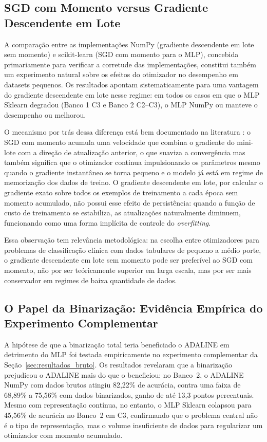 \subsection{SGD com Momento versus Gradiente Descendente em Lote}
\label{sec:discussao_adam}

A compara\c c\~ao entre as implementa\c c\~oes NumPy (gradiente descendente em lote sem momento) e scikit-learn (SGD com momento para o MLP), concebida primariamente para verificar a corretude das implementa\c c\~oes, constitui tamb\'em um experimento natural sobre os efeitos do otimizador no desempenho em datasets pequenos. Os resultados apontam sistematicamente para uma vantagem do gradiente descendente em lote nesse regime: em todos os casos em que o MLP Sklearn degradou (Banco 1 C3 e Banco 2 C2--C3), o MLP NumPy ou manteve o desempenho ou melhorou.

{\sloppy O mecanismo por tr\'as dessa diferen\c ca est\'a bem documentado na literatura \cite{silva2016,dsa2022}: o SGD com momento acumula uma velocidade que combina o gradiente do mini-lote com a dire\c c\~ao de atualiza\c c\~ao anterior, o que suaviza a converg\^encia mas tamb\'em significa que o otimizador continua impulsionando os par\^ametros mesmo quando o gradiente instant\^aneo se torna pequeno e o modelo j\'a est\'a em regime de memoriza\c c\~ao dos dados de treino. O gradiente descendente em lote, por calcular o gradiente exato sobre todos os exemplos de treinamento a cada \'epoca sem momento acumulado, n\~ao possui esse efeito de persist\^encia: quando a fun\c c\~ao de custo de treinamento se estabiliza, as atualiza\c c\~oes naturalmente diminuem, funcionando como uma forma impl\'icita de controle do \textit{overfitting}.\par}

Essa observa\c c\~ao tem relev\^ancia metodol\'ogica: na escolha entre otimizadores para problemas de classifica\c c\~ao cl\'inica com dados tabulares de pequeno a m\'edio porte, o gradiente descendente em lote sem momento pode ser prefer\'ivel ao SGD com momento, n\~ao por ser te\'oricamente superior em larga escala, mas por ser mais conservador em regimes de baixa quantidade de dados.

\subsection{O Papel da Binariza\c c\~ao: Evid\^encia Emp\'irica do Experimento Complementar}
\label{sec:discussao_binarizacao}

A hip\'otese de que a binariza\c c\~ao total teria beneficiado o ADALINE em detrimento do MLP foi testada empiricamente no experimento complementar da Se\c c\~ao~\ref{sec:resultados_bruto}. Os resultados revelaram que a binariza\c c\~ao prejudicou o ADALINE mais do que o beneficiou: no Banco~2, o ADALINE NumPy com dados brutos atingiu 82,22\% de acur\'acia, contra uma faixa de 68,89\% a 75,56\% com dados binarizados, ganho de at\'e 13,3 pontos percentuais. Mesmo com representa\c c\~ao cont\'inua, no entanto, o MLP Sklearn colapsou para 45,56\% de acur\'acia no Banco~2 em C3, confirmando que o problema central n\~ao \'e o tipo de representa\c c\~ao, mas o volume insuficiente de dados para regularizar um otimizador com momento acumulado.

